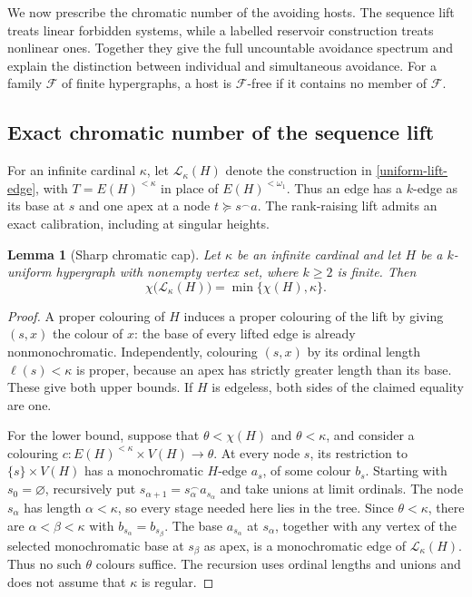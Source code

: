 \documentclass[a4paper,11pt,reqno]{amsart}
\theoremstyle{plain}
\newtheorem{lemma}[theorem]{Lemma}
\theoremstyle{definition}
\theoremstyle{remark}
\begin{document}
We now prescribe the chromatic number of the avoiding hosts.  The
sequence lift treats linear forbidden systems, while a labelled
reservoir construction treats nonlinear ones.  Together they give
the full uncountable avoidance spectrum and explain the distinction
between individual and simultaneous avoidance.
For a family $\mathcal F$ of finite hypergraphs, a host is
$\mathcal F$-free if it contains no member of $\mathcal F$.

\subsection{Exact chromatic number of the sequence lift}
\label{exact-lift-subsection}

For an infinite cardinal $\kappa$, let $\mathcal L_\kappa(H)$ denote
the construction in \eqref{uniform-lift-edge}, with
$T=E(H)^{<\kappa}$ in place of $E(H)^{<\omega_1}$.
Thus an edge has a $k$-edge as its base at $s$ and one apex at a node
$t\succeq s^\frown a$.  The rank-raising lift admits an exact
calibration, including at singular heights.

\begin{lemma}[Sharp chromatic cap]
\label{exact-lift-cap}
Let $\kappa$ be an infinite cardinal and let $H$ be a $k$-uniform
hypergraph with nonempty vertex set, where $k\ge2$ is finite.  Then
\[
 \chi\bigl(\mathcal L_\kappa(H)\bigr)
   =\min\{\chi(H),\kappa\}.
\]
\end{lemma}

\begin{proof}
A proper colouring of $H$ induces a proper colouring of the lift by
giving $(s,x)$ the colour of $x$: the base of every lifted edge is
already nonmonochromatic.  Independently, colouring $(s,x)$ by its
ordinal length $\ell(s)<\kappa$ is proper, because an apex has
strictly greater length than its base.  These give both upper bounds.
If $H$ is edgeless, both sides of the claimed equality are one.

For the lower bound, suppose that $\theta<\chi(H)$ and
$\theta<\kappa$, and consider a colouring
$c:E(H)^{<\kappa}\times V(H)\to\theta$.
At every node $s$, its restriction to $\{s\}\times V(H)$ has a
monochromatic $H$-edge $a_s$, of some colour $b_s$.
Starting with $s_0=\varnothing$, recursively put
$s_{\alpha+1}=s_\alpha^\frown a_{s_\alpha}$ and take unions at
limit ordinals.  The node $s_\alpha$ has length $\alpha<\kappa$,
so every stage needed here lies in the tree.
Since $\theta<\kappa$, there are $\alpha<\beta<\kappa$ with
$b_{s_\alpha}=b_{s_\beta}$.
The base $a_{s_\alpha}$ at $s_\alpha$, together with any vertex of
the selected monochromatic base at $s_\beta$ as apex, is a
monochromatic edge of $\mathcal L_\kappa(H)$.
Thus no such $\theta$ colours suffice.  The recursion uses ordinal
lengths and unions and does not assume that $\kappa$ is regular.
\end{proof}
\end{document}
